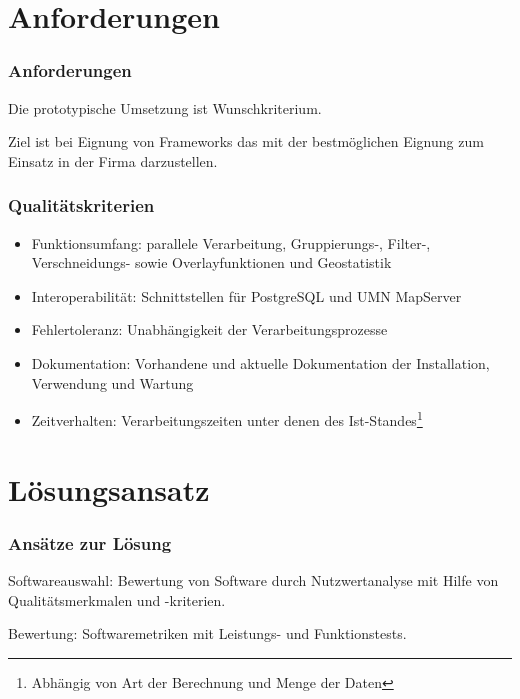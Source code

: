 \documentclass{beamer}
\begin{document}
% 

\section{Anforderungen}
\begin{frame}\frametitle{Anforderungen}
Die prototypische Umsetzung ist Wunschkriterium.\\ %

\vspace{\baselineskip}


Ziel ist bei Eignung von Frameworks das mit der bestmöglichen Eignung zum Einsatz in der Firma darzustellen.
\end{frame}

\begin{frame}\frametitle{Qualitätskriterien}
\begin{itemize}
\item Funktionsumfang: parallele Verarbeitung, Gruppierungs-, Filter-, Verschneidungs- sowie Overlayfunktionen und Geostatistik
\item Interoperabilität: Schnittstellen für PostgreSQL und UMN MapServer
\item Fehlertoleranz: Unabhängigkeit der Verarbeitungsprozesse
\item Dokumentation: Vorhandene und aktuelle Dokumentation der Installation, Verwendung und Wartung
\item Zeitverhalten: Verarbeitungszeiten unter denen des Ist-Standes\footnote{Abhängig von Art der Berechnung und Menge der Daten}
\end{itemize}
\end{frame}

\section{Lösungsansatz}


\begin{frame}\frametitle{Ansätze zur Lösung}
\begin{block}{Softwareauswahl:}
Bewertung von Software durch Nutzwertanalyse mit Hilfe von Qualitätsmerkmalen und -kriterien.\\
\end{block}
\vspace{\baselineskip}
\begin{block}{Bewertung:}
Softwaremetriken mit Leistungs- und Funktionstests.
\end{block}
\end{frame}
% 
\end{document}
